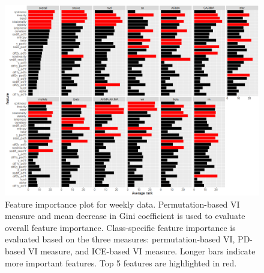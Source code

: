 \documentclass[11pt,a4paper,]{article}
\begin{document}
\begin{figure}[h]

{\centering \includegraphics{figures/viweekly-1} 

}

\caption{Feature importance plot for weekly data. Permutation-based VI measure and mean decrease in Gini coefficient is used to evaluate overall feature importance. Class-specific feature importance is evaluated based on the three measures: permutation-based VI, PD-based VI measure, and ICE-based VI measure. Longer bars indicate more important features. Top 5 features are highlighted in red.}\label{fig:viweekly}
\end{figure}

\newpage
\end{document}
